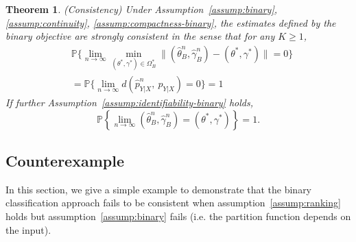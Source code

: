 \documentclass[11pt,a4paper]{article}
\newcommand{\wh}[1]{\widehat{#1}}
\newtheorem{theorem}{Theorem}[section]
\begin{document}
\begin{theorem}
  (Consistency) Under Assumption~\ref{assump:binary},
  \ref{assump:continuity}, \ref{assump:compactness-binary}, the
  estimates defined by the binary objective are strongly consistent
  in the sense that for any $K\geq 1$,
  \begin{equation*}
  \begin{aligned}
& \mathbb{P} \Big\{\lim_{n\rightarrow \infty} \min_{(\theta^*, \gamma^*)\in\Omega_B^*}\| (\wh{\theta}_B^n, \wh{\gamma}_B^n) - (\theta^*, \gamma^*) \| = 0 \Big\} \\
& = \mathbb{P} \Big\{\lim_{n\rightarrow \infty} d \left(\wh{p}_{Y|X}^n,~ p_{Y|X}\right) = 0  \Big\}  = 1 
  \end{aligned}
  \end{equation*}
If further Assumption~\ref{assump:identifiability-binary} holds, 
\[
\mathbb{P} \left\{\lim_{n\rightarrow \infty} (\wh{\theta}_B^n, \wh{\gamma}_B^n) = \left(\theta^*, \gamma^*\right) \right\} = 1.
\]
\label{thm:consistency-binary}
\end{theorem}



\subsection{Counterexample}
In this section, we give a simple example to demonstrate that the binary classification approach fails to be consistent when assumption~\ref{assump:ranking} holds but assumption~\ref{assump:binary} fails (i.e. the partition function depends on the input). 
\end{document}
